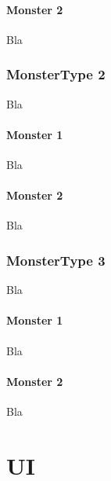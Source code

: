 \documentclass[a4paper,12pt]{book}
\begin{document}
\subsubsection{Monster 2}
Bla
\subsection{MonsterType 2}
Bla
\subsubsection{Monster 1}
Bla
\subsubsection{Monster 2}
Bla
\subsection{MonsterType 3}
Bla
\subsubsection{Monster 1}
Bla
\subsubsection{Monster 2}
Bla
\chapter{UI}
\end{document}
